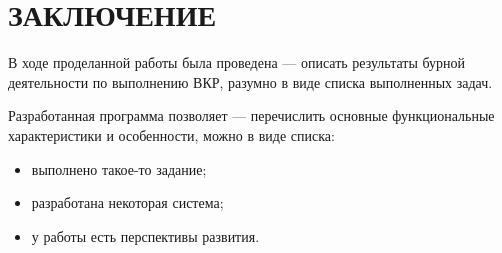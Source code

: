 \documentclass[a4paper,12pt]{article}
\begin{document}


\section*{\centering ЗАКЛЮЧЕНИЕ}

В ходе проделанной работы была проведена --- описать результаты бурной деятельности по выполнению ВКР, разумно в виде списка выполненных задач.

Разработанная программа позволяет --- перечислить основные функциональные характеристики и особенности, можно в виде списка:
\begin{itemize}
\item выполнено такое-то задание;
\item разработана некоторая система;
\item у работы есть перспективы развития.
\end{itemize}

\pagebreak

\printbibliography

\pagebreak

\renewcommand{\appendixpagename}{\centering Приложения}
\end{document}
